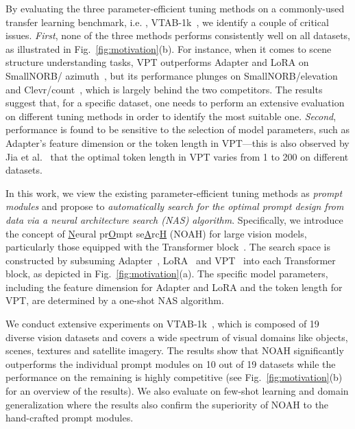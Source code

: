 By evaluating the three parameter-efficient tuning methods on a commonly-used transfer learning benchmark, i.e. , VTAB-1k~\cite{zhai2019large}, we identify a couple of critical issues. \emph{First}, none of the three methods performs consistently well on all datasets, as illustrated in Fig.~\ref{fig:motivation}(b). For instance, when it comes to scene structure understanding tasks, VPT outperforms Adapter and LoRA on SmallNORB/ azimuth~\cite{lecun2004learning}, but its performance plunges on SmallNORB/elevation~\cite{lecun2004learning} and Clevr/count~\cite{johnson2017clevr}, which is largely behind the two competitors. The results suggest that, for a specific dataset, one needs to perform an extensive evaluation on different tuning methods in order to identify the most suitable one. \emph{Second}, performance is found to be sensitive to the selection of model parameters, such as Adapter's feature dimension or the token length in VPT---this is also observed by Jia et al.~\cite{jia2022visual} that the optimal token length in VPT varies from 1 to 200 on different datasets.

In this work, we view the existing parameter-efficient tuning methods as \emph{prompt modules} and propose to \emph{automatically search for the optimal prompt design from data via a neural architecture search (NAS) algorithm}. Specifically, we introduce the concept of \underline{N}eural pr\underline{O}mpt se\underline{A}rc\underline{H} (NOAH) for large vision models, particularly those equipped with the Transformer block~\cite{dosovitskiy2020image}. The search space is constructed by subsuming Adapter~\cite{houlsby2019parameter}, LoRA~\cite{hu2021lora} and VPT~\cite{jia2022visual} into each Transformer block, as depicted in Fig.~\ref{fig:motivation}(a). The specific model parameters, including the feature dimension for Adapter and LoRA and the token length for VPT, are determined by a one-shot NAS algorithm.

We conduct extensive experiments on VTAB-1k~\cite{zhai2019large}, which is composed of 19 diverse vision datasets and covers a wide spectrum of visual domains like objects, scenes, textures and satellite imagery. The results show that NOAH significantly outperforms the individual prompt modules on 10 out of 19 datasets while the performance on the remaining is highly competitive (see Fig.~\ref{fig:motivation}(b) for an overview of the results). We also evaluate on few-shot learning and domain generalization where the results also confirm the superiority of NOAH to the hand-crafted prompt modules.

